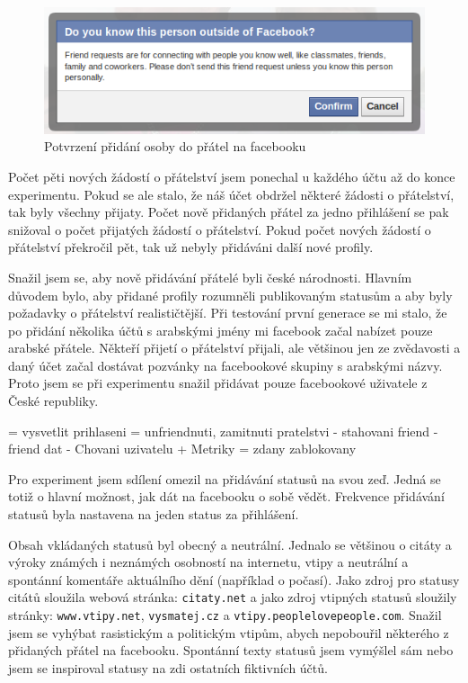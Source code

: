 \documentclass[thesis=M,czech]{FITthesis}[2013/05/10]
\begin{document}
\begin{figure}[h]
\begin{center}
\includegraphics[width=5in]{figures/confirm-friendship.png}
\caption{Potvrzení přidání osoby do přátel na facebooku}
\label{fig:confirmFriendship}
\end{center}
\end{figure}

Počet pěti nových žádostí o přátelství jsem ponechal u každého účtu až do konce experimentu. Pokud se ale stalo, že náš účet obdržel některé žádosti o přátelství, tak byly všechny přijaty. Počet nově přidaných přátel za jedno přihlášení se pak snižoval o počet přijatých žádostí o přátelství. Pokud počet nových žádostí o přátelství překročil pět, tak už nebyly přidáváni další nové profily.

Snažil jsem se, aby nově přidávání přátelé byli české národnosti. Hlavním důvodem bylo, aby přidané profily rozumněli publikovaným statusům a aby byly požadavky o přátelství realističtější. Při testování první generace se mi stalo, že po přidání několika účtů s arabskými jmény mi facebook začal nabízet pouze arabské přátele. Někteří přijetí o přátelství přijali, ale většinou jen ze zvědavosti a daný účet začal dostávat pozvánky na facebookové skupiny s arabskými názvy. Proto jsem se při experimentu snažil přidávat pouze facebookové uživatele z České republiky.



= vysvetlit prihlaseni
= unfriendnuti, zamitnuti pratelstvi
- stahovani friend - friend dat
- Chovani uzivatelu + Metriky
= zdany zablokovany

Pro experiment jsem sdílení omezil na přidávání statusů na svou zeď. Jedná se totiž o hlavní možnost, jak dát na facebooku o sobě vědět. Frekvence přidávání statusů byla nastavena na jeden status za přihlášení. 

Obsah vkládaných statusů byl obecný a neutrální. Jednalo se většinou o citáty a výroky známých i neznámých osobností na internetu, vtipy a neutrální a spontánní komentáře aktuálního dění (například o počasí). Jako zdroj pro statusy citátů sloužila webová stránka: \verb|citaty.net| a jako zdroj vtipných statusů sloužily stránky: \verb|www.vtipy.net|, \verb|vysmatej.cz| a \verb|vtipy.peoplelovepeople.com|. Snažil jsem se vyhýbat rasistickým a politickým vtipům, abych nepobouřil některého z přidaných přátel na facebooku. Spontánní texty statusů jsem vymýšlel sám nebo jsem se inspiroval statusy na zdi ostatních fiktivních účtů.
\end{document}
